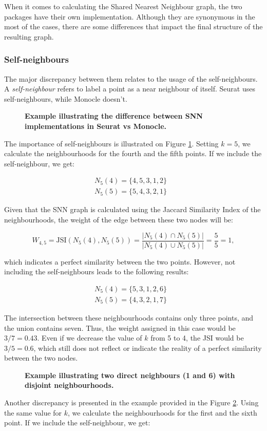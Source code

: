 When it comes to calculating the Shared Nearest Neighbour graph, the two packages have their own implementation. Although they are synonymous in the most of the cases, there are some differences that impact the final structure of the resulting graph.

\subsubsection{Self-neighbours}
The major discrepancy between them relates to the usage of the self-neighbours. A \textit{self-neighbour} refers to label a point as a near neighbour of itself. Seurat uses self-neighbours, while Monocle doesn't.
\begin{figure}[H]
    \centering
    \caption{\label{fig:s4-m3-snn-1}\textbf{Example illustrating the difference between SNN implementations in Seurat vs Monocle.}}
\end{figure}
The importance of self-neighbours is illustrated on Figure \ref{fig:s4-m3-snn-1}. Setting $k = 5$, we calculate the neighbourhoods for the fourth and the fifth points. If we include the self-neighbour, we get:

\[ \begin{aligned}
        N_5(4) = \{4,5,3,1,2\} & \\
        N_5(5) = \{5,4,3,2,1\}
    \end{aligned}
\]

Given that the SNN graph is calculated using the Jaccard Similarity Index of the neighbourhoods, the weight of the edge between these two nodes will be:

\[ W_{4,5} = \textrm{JSI}(N_5(4), N_5(5)) = \frac{|N_5(4) \cap N_5(5)|}{|N_5(4) \cup N_5(5)|} = \frac{5}{5} = 1 ,\]

which indicates a perfect similarity between the two points. However, not including the self-neighbours leads to the following results:

\[ \begin{aligned}
        N_5(4) = \{5,3,1,2,6\} & \\
        N_5(5) = \{4,3,2,1,7\}
    \end{aligned}
\]

The intersection between these neighbourhoods contains only three points, and the union contains seven. Thus, the weight assigned in this case would be $3 / 7 = 0.43$. Even if we decrease the value of $k$ from 5 to 4, the JSI would be $3 / 5 = 0.6$, which still does not reflect or indicate the reality of a perfect similarity between the two nodes.
\begin{figure}[H]
    \centering
    \caption{\label{fig:s4-m3-snn-2}\textbf{Example illustrating two direct neighbours (1 and 6) with disjoint
neighbourhoods.}}
\end{figure}
Another discrepancy is presented in the example provided in the Figure \ref{fig:s4-m3-snn-2}. Using the same value for $k$, we calculate the neighbourhoods for the first and the sixth point. If we include the self-neighbour, we get:

